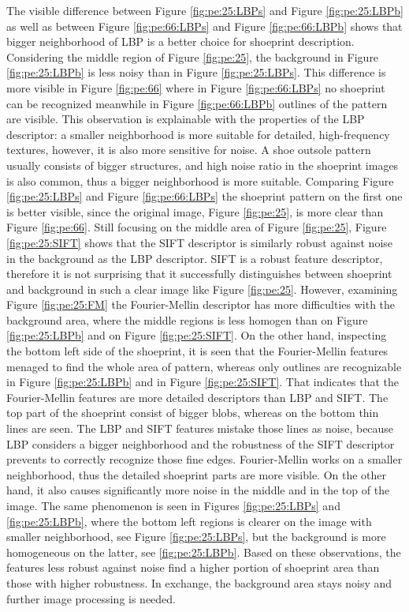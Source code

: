 \documentclass[draft,final]{vutinfth} %
\begin{document}
\par
The visible difference between Figure \ref{fig:pe:25:LBPs} and Figure \ref{fig:pe:25:LBPb} as well as between Figure \ref{fig:pe:66:LBPs} and Figure \ref{fig:pe:66:LBPb} shows that bigger neighborhood of LBP is a better choice for shoeprint description.
Considering the middle region of Figure \ref{fig:pe:25}, the background in Figure \ref{fig:pe:25:LBPb} is less noisy than in Figure \ref{fig:pe:25:LBPs}.
This difference is more visible in  Figure \ref{fig:pe:66} where in Figure \ref{fig:pe:66:LBPs} no shoeprint can be recognized meanwhile in Figure \ref{fig:pe:66:LBPb} outlines of the pattern are visible.
This observation is explainable with the properties of the LBP descriptor: a smaller neighborhood is more suitable for detailed, high-frequency textures, however, it is also more sensitive for noise.
A shoe outsole pattern usually consists of bigger structures, and high noise ratio in the shoeprint images is also common, thus a bigger neighborhood is more suitable.
Comparing Figure \ref{fig:pe:25:LBPs} and Figure \ref{fig:pe:66:LBPs} the shoeprint pattern on the first one is better visible, since the original image, Figure \ref{fig:pe:25}, is more clear than Figure \ref{fig:pe:66}.
Still focusing on the middle area of Figure \ref{fig:pe:25}, Figure \ref{fig:pe:25:SIFT} shows that the SIFT descriptor is similarly robust against noise in the background as the LBP descriptor.
SIFT is a robust feature descriptor, therefore it is not surprising that it successfully distinguishes between shoeprint and background in such a clear image like Figure \ref{fig:pe:25}.
However, examining Figure  \ref{fig:pe:25:FM} the Fourier-Mellin descriptor has more difficulties with the background area, where the middle regions is less homogen than on  Figure \ref{fig:pe:25:LBPb} and on Figure \ref{fig:pe:25:SIFT}.
On the other hand, inspecting the bottom left side of the shoeprint, it is seen that the Fourier-Mellin features menaged to find the whole area of pattern, whereas only outlines are recognizable in Figure \ref{fig:pe:25:LBPb} and in Figure \ref{fig:pe:25:SIFT}.
That indicates that the Fourier-Mellin features are more detailed descriptors than LBP and SIFT. 
The top part of the shoeprint consist of bigger blobs, whereas on the bottom thin lines are seen.
The LBP and SIFT features mistake those lines as noise, because LBP considers a bigger neighborhood and the robustness of the SIFT descriptor prevents to correctly recognize those fine edges.
Fourier-Mellin works on a smaller neighborhood, thus the detailed shoeprint parts are more visible.
On the other hand, it also causes significantly more noise in the middle and in the top of the image.
The same phenomenon is seen in Figures  \ref{fig:pe:25:LBPs} and  \ref{fig:pe:25:LBPb}, where the bottom left regions is clearer on the image  with smaller neighborhood, see Figure \ref{fig:pe:25:LBPs}, but the background is more homogeneous on the latter, see \ref{fig:pe:25:LBPb}. 
Based on these observations,  the features less robust against noise find a higher portion of shoeprint area than those with higher robustness.
In exchange, the background area stays noisy and further image processing is needed.
\end{document}
